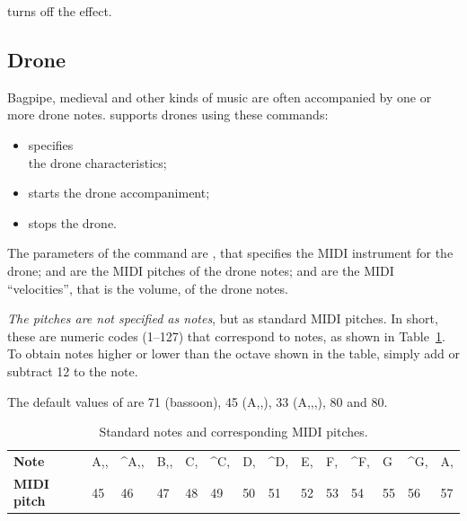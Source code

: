 \documentclass[a4paper,fullpage,12pt]{book}
\begin{document}
 turns off the effect.


\subsection{Drone}
\label{sec:drone}

Bagpipe, medieval and other kinds of music are often accompanied by one or
more drone notes. \abcmid{} supports drones using these commands:

\begin{itemize}
  
  \item {} specifies\\
  the drone characteristics;
  
  \item {} starts the drone accompaniment;
  
  \item {} stops the drone.
  
\end{itemize}

The parameters of the  command are
, that specifies the MIDI instrument for the drone;
 and  are the MIDI pitches of the drone
notes;  and  are the MIDI ``velocities'', that
is the volume, of the drone notes.

\emph{The pitches are not specified as \ABC{} notes}, but as standard
MIDI pitches. In short, these are numeric codes (1--127) that correspond to
notes, as shown in Table~\ref{tab:midipitch}. To obtain notes higher or
lower than the octave shown in the table, simply add or subtract 12 to the
note.

The default values of  are 71 (bassoon), 45 (A,,), 33
(A,,,), 80 and 80.

\begin{table}[htbp]
\centering
\begin{tabular}{llllllllllllll}
\toprule %
\textbf{Note} & A,, & \^{}A,, & B,, & C, & \^{}C, & D, & \^{}D, & E, &
F, & \^{}F, & G & \^{}G, & A, \\
\textbf{MIDI pitch} & 45 & 46 & 47 & 48 & 49 & 50 & 51 & 52 & 53 &
54 & 55 & 56 & 57 \\
\bottomrule \hline
\end{tabular}
\caption{Standard notes and corresponding MIDI pitches.}
\label{tab:midipitch}
\end{table}
\end{document}

